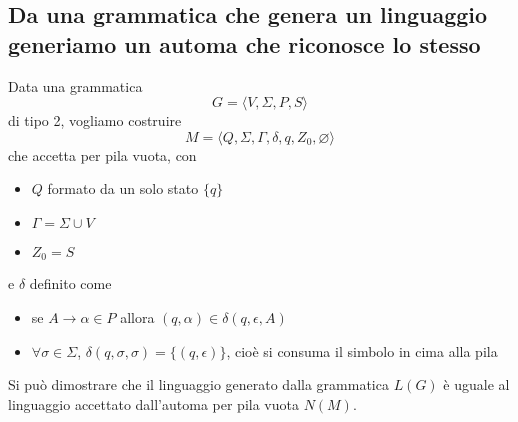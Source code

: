 \documentclass[12pt]{report}
\begin{document}
\subsection{Da una grammatica che genera un linguaggio generiamo un automa che riconosce lo stesso}
Data una grammatica
$$ G = \langle V, \Sigma, P, S \rangle $$
di tipo 2, vogliamo costruire
$$ M = \langle Q, \Sigma, \Gamma, \delta, q, Z_0, \varnothing \rangle $$
che accetta per pila vuota, con
\begin{itemize}
 	\item $Q$ formato da un solo stato $\{q\}$
 	\item $\Gamma = \Sigma \cup V$
 	\item $Z_0 = S$
\end{itemize}
e $\delta$ definito come
\begin{itemize}
 	\item se $A \rightarrow \alpha \in P$ allora $(q, \alpha) \in \delta(q, \epsilon, A)$
 	\item $\forall \sigma \in \Sigma$, $\delta(q, \sigma, \sigma) = \{ (q, \epsilon) \}$, cioè si consuma il simbolo in cima alla pila
\end{itemize}
 
Si può dimostrare che il linguaggio generato dalla grammatica $L(G)$ è uguale al linguaggio accettato dall'automa per pila vuota $N(M)$.
\end{document}

